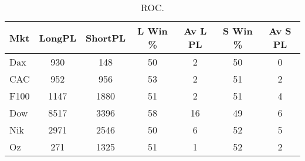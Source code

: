 \begin{table}[ht]
\centering
\caption[ROC]{ROC.} 
\label{tab:mac_roc_results}
\begin{tabular}{lcccccc}
  \toprule Mkt & LongPL & ShortPL & L Win \% & Av L PL & S Win \% & Av S PL \\ 
  \midrule Dax & 930 & 148 & 50 & 2 & 50 & 0 \\ 
  CAC & 952 & 956 & 53 & 2 & 51 & 2 \\ 
  F100 & 1147 & 1880 & 51 & 2 & 51 & 4 \\ 
  Dow & 8517 & 3396 & 58 & 16 & 49 & 6 \\ 
  Nik & 2971 & 2546 & 50 & 6 & 52 & 5 \\ 
  Oz & 271 & 1325 & 51 & 1 & 52 & 2 \\ 
   \bottomrule \end{tabular}
\end{table}
